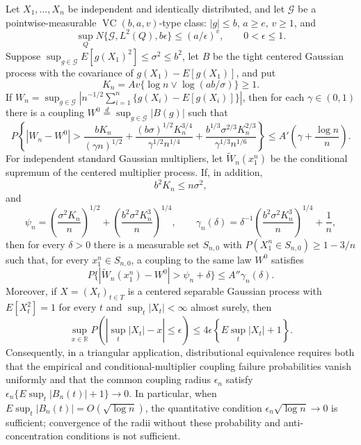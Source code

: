Let \(X_1,\ldots,X_n\) be independent and identically distributed, and let \(\mathcal G\) be a pointwise-measurable \(\operatorname{VC}(b,a,v)\)-type class: \(|g|\le b\), \(a\ge e\), \(v\ge1\), and
\[
 \sup_Q N\{\mathcal G,L^2(Q),b\epsilon\}\le(a/\epsilon)^v,
 \qquad 0<\epsilon\le1.
\]
Suppose \(\sup_{g\in\mathcal G}E[g(X_1)^2]\le\sigma^2\le b^2\), let \(B\) be the tight centered Gaussian process with the covariance of \(g(X_1)-E[g(X_1)]\), and put
\[
 K_n=Av\{\log n\vee\log(ab/\sigma)\}\ge1.
\]
If \(W_n=\sup_{g\in\mathcal G}|n^{-1/2}\sum_{i=1}^n\{g(X_i)-E[g(X_i)]\}|\), then for each \(\gamma\in(0,1)\) there is a coupling \(W^0\stackrel d=\sup_{g\in\mathcal G}|B(g)|\) such that
\[
 P\left\{|W_n-W^0|>
 \frac{bK_n}{(\gamma n)^{1/2}}+
 \frac{(b\sigma)^{1/2}K_n^{3/4}}{\gamma^{1/2}n^{1/4}}+
 \frac{b^{1/3}\sigma^{2/3}K_n^{2/3}}{\gamma^{1/3}n^{1/6}}
 \right\}
 \le A'\left(\gamma+\frac{\log n}{n}\right).
\]
For independent standard Gaussian multipliers, let \(\widetilde W_n(x_1^n)\) be the conditional supremum of the centered multiplier process. If, in addition,
\[
 b^2K_n\le n\sigma^2,
\]
and
\[
 \psi_n=\left(\frac{\sigma^2K_n}{n}\right)^{1/2}
 +\left(\frac{b^2\sigma^2K_n^3}{n}\right)^{1/4},
 \qquad
 \gamma_n(\delta)=\delta^{-1}
 \left(\frac{b^2\sigma^2K_n^3}{n}\right)^{1/4}+\frac1n,
\]
then for every \(\delta>0\) there is a measurable set \(S_{n,0}\) with \(P(X_1^n\in S_{n,0})\ge1-3/n\) such that, for every \(x_1^n\in S_{n,0}\), a coupling to the same law \(W^0\) satisfies
\[
 P\{|\widetilde W_n(x_1^n)-W^0|>\psi_n+\delta\}
 \le A''\gamma_n(\delta).
\]
Moreover, if \(X=(X_t)_{t\in T}\) is a centered separable Gaussian process with \(E[X_t^2]=1\) for every \(t\) and \(\sup_t|X_t|<\infty\) almost surely, then
\[
 \sup_{x\in\mathbb R}P\left(\left|\sup_t|X_t|-x\right|\le\epsilon\right)
 \le4\epsilon\left\{E\sup_t|X_t|+1\right\}.
\]
Consequently, in a triangular application, distributional equivalence requires both that the empirical and conditional-multiplier coupling failure probabilities vanish uniformly and that the common coupling radius \(\epsilon_n\) satisfy \(\epsilon_n\{E\sup_t|B_n(t)|+1\}\to0\). In particular, when \(E\sup_t|B_n(t)|=O(\sqrt{\log n})\), the quantitative condition \(\epsilon_n\sqrt{\log n}\to0\) is sufficient; convergence of the radii without these probability and anti-concentration conditions is not sufficient.